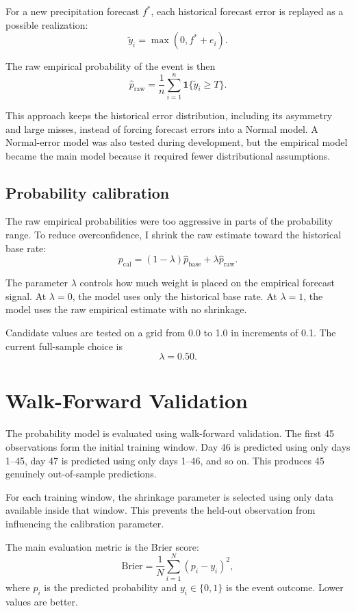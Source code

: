 \documentclass[11pt]{article}
\begin{document}
For a new precipitation forecast $f^*$, each historical forecast error is replayed as a possible realization:
\[
\tilde y_i = \max(0, f^* + e_i).
\]

The raw empirical probability of the event is then
\[
\hat p_{\text{raw}}
=
\frac{1}{n}
\sum_{i=1}^{n}
\mathbf{1}\{\tilde y_i \geq T\}.
\]

This approach keeps the historical error distribution, including its asymmetry and large misses, instead of forcing forecast errors into a Normal model. A Normal-error model was also tested during development, but the empirical model became the main model because it required fewer distributional assumptions.

\subsection{Probability calibration}

The raw empirical probabilities were too aggressive in parts of the probability range. To reduce overconfidence, I shrink the raw estimate toward the historical base rate:
\[
p_{\text{cal}}
=
(1-\lambda)\hat p_{\text{base}}
+
\lambda \hat p_{\text{raw}}.
\]

The parameter $\lambda$ controls how much weight is placed on the empirical forecast signal. At $\lambda=0$, the model uses only the historical base rate. At $\lambda=1$, the model uses the raw empirical estimate with no shrinkage.

Candidate values are tested on a grid from 0.0 to 1.0 in increments of 0.1. The current full-sample choice is
\[
\lambda = 0.50.
\]

\section{Walk-Forward Validation}

The probability model is evaluated using walk-forward validation. The first 45 observations form the initial training window. Day 46 is predicted using only days 1--45, day 47 is predicted using only days 1--46, and so on. This produces 45 genuinely out-of-sample predictions.

For each training window, the shrinkage parameter is selected using only data available inside that window. This prevents the held-out observation from influencing the calibration parameter.

The main evaluation metric is the Brier score:
\[
\text{Brier}
=
\frac{1}{N}
\sum_{i=1}^{N}(p_i-y_i)^2,
\]
where $p_i$ is the predicted probability and $y_i\in\{0,1\}$ is the event outcome. Lower values are better.
\end{document}
